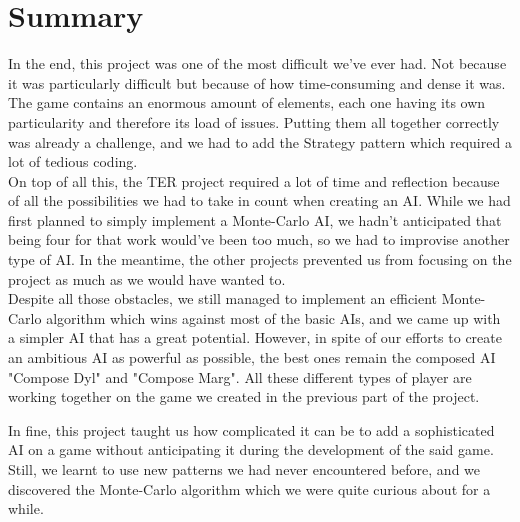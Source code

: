 \part{Summary} 

In the end, this project was one of the most difficult we've ever had. Not because it was particularly difficult but because of how time-consuming and dense it was. The game contains an enormous amount of elements, each one having its own particularity and therefore its load of issues. Putting them all together correctly was already a challenge, and we had to add the Strategy pattern which required a lot of tedious coding.\\

On top of all this, the TER project required a lot of time and reflection because of all the possibilities we had to take in count when creating an AI. While we had first planned to simply implement a Monte-Carlo AI, we hadn't anticipated that being four for that work would've been too much, so we had to improvise another type of AI. In the meantime, the other projects prevented us from focusing on the project as much as we would have wanted to.\\

Despite all those obstacles, we still managed to implement an efficient Monte-Carlo algorithm which wins against most of the basic AIs, and we came up with a simpler AI that has a great potential. However, in spite of our efforts to create an ambitious AI as powerful as possible, the best ones remain the composed AI "Compose Dyl" and "Compose Marg". All these different types of player are working together on the game we created in the previous part of the project.

In fine, this project taught us how complicated it can be to add a sophisticated AI on a game without anticipating it during the development of the said game. Still, we learnt to use new patterns we had never encountered before, and we discovered the Monte-Carlo algorithm which we were quite curious about for a while.